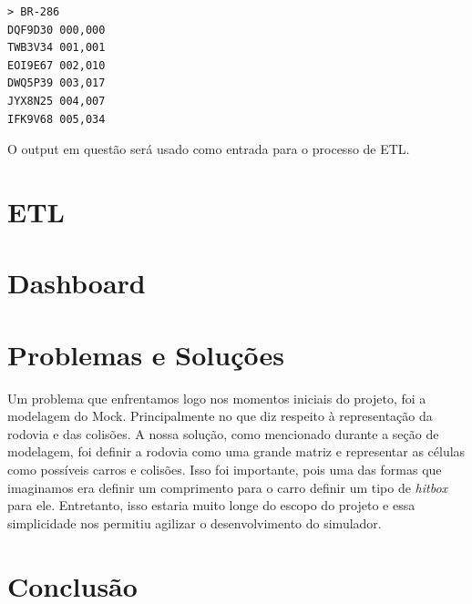 \documentclass{article}
\begin{document}
    \begin{verbatim}
> BR-286
DQF9D30 000,000
TWB3V34 001,001
EOI9E67 002,010
DWQ5P39 003,017
JYX8N25 004,007
IFK9V68 005,034
    \end{verbatim}

    O output em questão será usado como entrada para o processo de ETL.

    \section{ETL}

    \section{Dashboard}

    \section{Problemas e Soluções}
    Um problema que enfrentamos logo nos momentos iniciais do projeto, foi a modelagem do Mock. Principalmente
    no que diz respeito à representação da rodovia e das colisões. A nossa solução, como mencionado durante a 
    seção de modelagem, foi definir a rodovia como uma grande matriz e representar as células como possíveis
    carros e colisões. Isso foi importante, pois uma das formas que imaginamos era definir um comprimento para o 
    carro definir um tipo de \textit{hitbox} para ele. Entretanto, isso estaria muito longe do escopo do projeto
    e essa simplicidade nos permitiu agilizar o desenvolvimento do simulador.

    \section{Conclusão}
\end{document}
